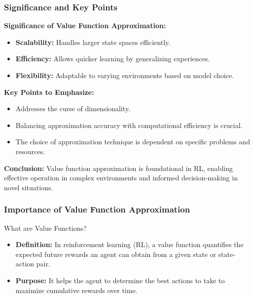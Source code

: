\documentclass[aspectratio=169]{beamer}
\begin{document}
\begin{frame}[fragile]
    \frametitle{Significance and Key Points}

    \textbf{Significance of Value Function Approximation:}
    \begin{itemize}
        \item \textbf{Scalability:} Handles larger state spaces efficiently.
        \item \textbf{Efficiency:} Allows quicker learning by generalizing experiences.
        \item \textbf{Flexibility:} Adaptable to varying environments based on model choice.
    \end{itemize}

    \textbf{Key Points to Emphasize:}
    \begin{itemize}
        \item Addresses the curse of dimensionality.
        \item Balancing approximation accuracy with computational efficiency is crucial.
        \item The choice of approximation technique is dependent on specific problems and resources.
    \end{itemize}

    \textbf{Conclusion:}  
    Value function approximation is foundational in RL, enabling effective operation in complex environments and informed decision-making in novel situations.
\end{frame}

\begin{frame}[fragile]
    \frametitle{Importance of Value Function Approximation}
    \begin{block}{What are Value Functions?}
        \begin{itemize}
            \item \textbf{Definition:} In reinforcement learning (RL), a value function quantifies the expected future rewards an agent can obtain from a given state or state-action pair.
            \item \textbf{Purpose:} It helps the agent to determine the best actions to take to maximize cumulative rewards over time.
        \end{itemize}
    \end{block}
\end{frame}
\end{document}
